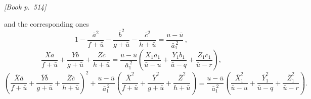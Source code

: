 \documentclass[11pt]{article}
\begin{document}
\medskip
\noindent\textit{[Book p.~514]}\hfill

\smallskip

\noindent and the corresponding ones
\[
1 - \frac{\bar{a}^{2}}{f + \bar{u}} - \frac{\bar{b}^{2}}{g + \bar{u}} - \frac{\bar{c}^{2}}{h + \bar{u}} = \frac{u - \bar{u}}{\bar{a}_{1}^{\,2}}\,,
\]
\[
\frac{\bar{X}\bar{a}}{f + \bar{u}} + \frac{\bar{Y}\bar{b}}{g + \bar{u}} + \frac{\bar{Z}\bar{c}}{h + \bar{u}} = \frac{u - \bar{u}}{\bar{a}_{1}^{\,2}}\!\left(\frac{\bar{X}_{1} \bar{a}_{1}}{\bar{u} - u} + \frac{\bar{Y}_{1} \bar{b}_{1}}{\bar{u} - q} + \frac{\bar{Z}_{1} \bar{c}_{1}}{\bar{u} - r}\right),
\]
\[
\left(\frac{\bar{X}\bar{a}}{f + \bar{u}} + \frac{\bar{Y}\bar{b}}{g + \bar{u}} + \frac{\bar{Z}\bar{c}}{h + \bar{u}}\right)^{\!2} + \frac{u - \bar{u}}{\bar{a}_{1}^{\,2}}\!\left(\frac{\bar{X}^{2}}{f + \bar{u}} + \frac{\bar{Y}^{2}}{g + \bar{u}} + \frac{\bar{Z}^{2}}{h + \bar{u}}\right) = \frac{u - \bar{u}}{\bar{a}_{1}^{\,2}}\!\left(\frac{\bar{X}_{1}^{2}}{\bar{u} - u} + \frac{\bar{Y}_{1}^{2}}{\bar{u} - q} + \frac{\bar{Z}_{1}^{2}}{\bar{u} - r}\right).
\]
\end{document}
